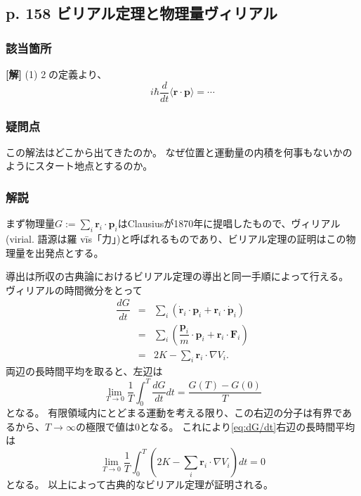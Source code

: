 \documentclass{jsarticle}
\begin{document}
\subsection*{p. 158 ビリアル定理と物理量ヴィリアル}

\subsubsection*{該当箇所}

\textbf{[解]}  (1) \textcircled{2}の定義より、
\begin{equation*}
    i\hbar\dfrac{d}{dt}\langle\bm{r}\cdot\bm{p}\rangle
    =\cdots
\end{equation*}

\subsubsection*{疑問点}

この解法はどこから出てきたのか。
なぜ位置と運動量の内積を何事もないかのようにスタート地点とするのか。

\subsubsection*{解説}
まず物理量$G:=\displaystyle\sum_i\bm{r}_i\cdot \bm{p}_i$はClausiusが1870年に提唱したもので、ヴィリアル (virial. 語源は羅 vīs「力」)と呼ばれるものであり、ビリアル定理の証明はこの物理量を出発点とする。

導出は\cite{virial wili}所収の古典論におけるビリアル定理の導出と同一手順によって行える。
ヴィリアルの時間微分をとって
\begin{equation}
    \label{eq:dG/dt}
    \begin{array}{rcl}
        \dfrac{dG}{dt}
        &=&
        \displaystyle
        \sum_i(
            \dot{\bm{r}}_i\cdot\bm{p}_i
            +
            \bm{r}_i\cdot\dot{\bm{p}}_i
            )
        \\
        &=&
        \displaystyle
        \sum_i
        \left(
            \dfrac{\bm{p}_i}{m}\cdot\bm{p}_i
            +
            \bm{r}_i\cdot\bm{F}_i
        \right)
        \\
        &=&
        2K
        -
        \displaystyle\sum_i
        \bm{r}_i\cdot\nabla V_i
        .
    \end{array}
\end{equation}
両辺の長時間平均を取ると、左辺は
\begin{equation*}
    \lim_{T\to0} \dfrac{1}{T}\displaystyle\int_0^T\frac{dG}{dt}dt=\frac{G(T)-G(0)}{T}
\end{equation*}
となる。
有限領域内にとどまる運動を考える限り、この右辺の分子は有界であるから、$T\to\infty$の極限で値は$0$となる。
これにより\eqref{eq:dG/dt}右辺の長時間平均は
\begin{equation*}
    \lim_{T\to0}
    \dfrac{1}{T}
    \displaystyle
    \int_0^T
    \left(
        2K
        -
        \sum_i\bm{r}_i\cdot\nabla V_i
    \right)
    dt
    =0
\end{equation*}
となる。
以上によって古典的なビリアル定理が証明される。
\end{document}
